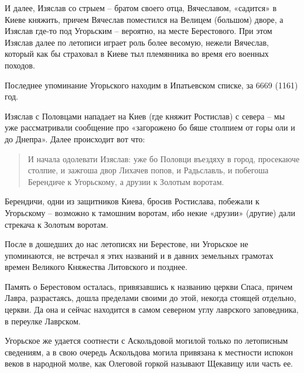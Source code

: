 И далее, Изяслав со стрыем – братом своего отца, Вячеславом, «садится» в Киеве княжить, причем Вячеслав поместился на Велицем (большом) дворе, а Изяслав где-то под Угорьским – вероятно, на месте Берестового. При этом Изяслав далее по летописи играет роль более весомую, нежели Вячеслав, который как бы страховал в Киеве тыл племянника во время его военных походов.

Последнее упоминание Угорьского находим в Ипатьевском списке, за 6669 (1161) год. 

Изяслав с Половцами нападает на Киев (где княжит Ростислав) с севера – мы уже рассматривали сообщение про «загорожено бо бяше столпием от горы оли и до Днепра». Далее происходит вот что:

\begin{quotation}
И начала одолевати Изяслав: уже бо Половци въездяху в город, просекаюче столпие, и зажгоша двор Лихачев попов, и Радьславль, и побегоша Берендиче к Угорьскому, а друзии к Золотым воротам.
\end{quotation}

Берендичи, одни из защитников Киева, бросив Ростислава, побежали к Угорьскому – возможно к тамошним воротам, ибо некие «друзии» (другие) дали стрекача к Золотым воротам.

После в дошедших до нас летописях ни Берестове, ни Угорьское не упоминаются, не встречал я этих названий и в давних земельных грамотах времен Великого Княжества Литовского и позднее.

Память о Берестовом осталась, привязавшись к названию церкви Спаса, причем Лавра, разрастаясь, дошла пределами своими до этой, некогда стоящей отдельно, церкви. Да она и сейчас находится в самом северном углу лаврского заповедника, в переулке Лаврском.

Угорьское же удается соотнести с Аскольдовой могилой только по летописным сведениям, а в свою очередь Аскольдова могила привязана к местности испокон веков в народной молве, как Олеговой горкой называют Щекавицу или часть ее. 

